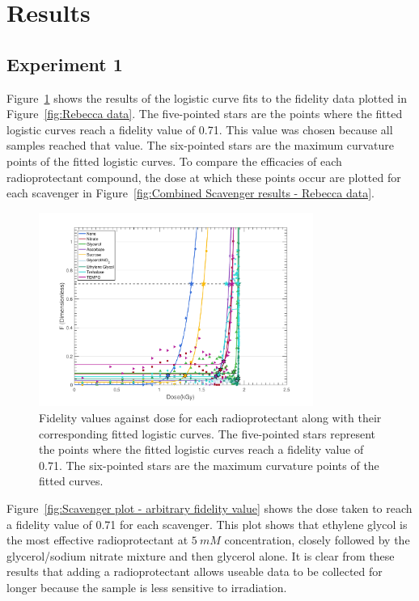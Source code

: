 \section{Results}
\label{sec:Results}

\subsection{Experiment 1}
\label{sub:Experiment 1 - Results}
Figure~\ref{fig:Main radioprotectant plot - Rebecca data} shows the results of the logistic curve fits to the fidelity data plotted in Figure~\ref{fig:Rebecca data}. The five-pointed stars are the points where the fitted logistic curves reach a fidelity value of 0.71. This value was chosen because all samples reached that value. The six-pointed stars are the maximum curvature points of the fitted logistic curves. To compare the efficacies of each radioprotectant compound, the dose at which these points occur are plotted for each scavenger in Figure~\ref{fig:Combined Scavenger results - Rebecca data}.

\begin{figure}
    \centering
    \includegraphics[width=0.8\textwidth]{figures/saxs/ScavengerPlot.pdf}
    \caption{Fidelity values against dose for each radioprotectant along with their corresponding fitted logistic curves. The five-pointed stars represent the points where the fitted logistic curves reach a fidelity value of 0.71. The six-pointed stars are the maximum curvature points of the fitted curves.}
    \label{fig:Main radioprotectant plot - Rebecca data}
\end{figure}

Figure~\ref{fig:Scavenger plot - arbitrary fidelity value} shows the dose taken to reach a fidelity value of 0.71 for each scavenger. This plot shows that ethylene glycol is the most effective radioprotectant at $5\ mM$ concentration, closely followed by the glycerol/sodium nitrate mixture and then glycerol alone. It is clear from these results that adding a radioprotectant allows useable data to be collected for longer because the sample is less sensitive to irradiation.

